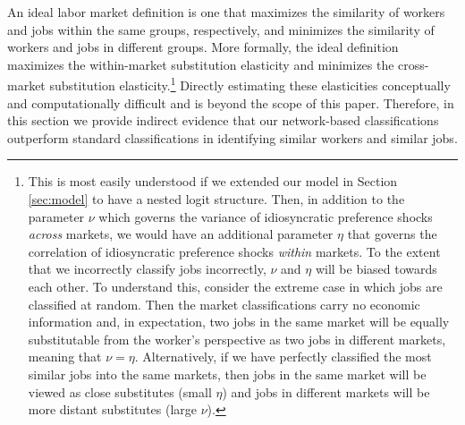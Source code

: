 \documentclass[12pt]{article}
\theoremstyle{definition}
\theoremstyle{plain}
\begin{document}




An ideal labor market definition is one that maximizes the similarity of workers and jobs within the same groups, respectively, and minimizes the similarity of workers and jobs in different groups. More formally, the ideal definition maximizes the within-market substitution elasticity and minimizes the cross-market substitution elasticity.\footnote{This is most easily understood if we extended our model in Section \ref{sec:model} to have a nested logit structure. Then, in addition to the parameter $\nu$ which governs the variance of idiosyncratic preference shocks \emph{across} markets, we would have an additional parameter $\eta$ that governs the correlation of idiosyncratic preference shocks \emph{within} markets. To the extent that we incorrectly classify jobs incorrectly, $\nu$ and $\eta$ will be biased towards each other. To understand this, consider the extreme case in which jobs are classified at random. Then the market classifications carry no economic information and, in expectation, two jobs in the same market will be equally substitutable from the worker's perspective as two jobs in different markets, meaning that $\nu=\eta$. Alternatively, if we have perfectly classified the most similar jobs into the same markets, then jobs in the same market will be viewed as close substitutes (small $\eta$) and jobs in different markets will be more distant substitutes (large $\nu$). } Directly estimating these elasticities conceptually and computationally difficult and is beyond the scope of this paper. Therefore, in this section we provide indirect evidence that our network-based classifications outperform standard classifications in identifying similar workers and similar jobs. 
\end{document}
